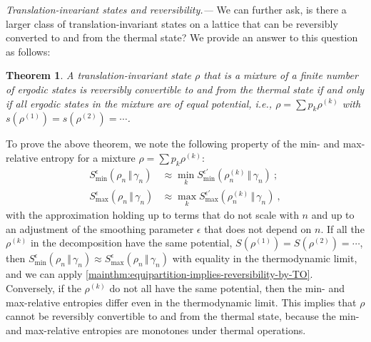 \documentclass[prl,reprint,longbibliography,superscriptaddress]{revtex4-1}
\newcounter{thm}
\newtheorem{maintheorem}[thm]{Theorem}
\renewcommand\paragraph[1]{\par\emph{#1.---}\kern2pt\relax\ignorespaces}
\begin{document}
\paragraph{Translation-invariant states and reversibility}
We can further ask, is there a larger class of translation-invariant states on a
lattice that can be reversibly converted to and from the thermal state?  We
provide an answer to this question as follows:

\begin{maintheorem}
  \label{mainthm:thermo-potential-iff-mix-ergodic-states-eq-potential}
  A translation-invariant state $\rho$ that is a mixture of a finite number of
  ergodic states is reversibly convertible to and from the thermal state if and
  only if all ergodic states in the mixture are of equal potential, i.e.,
  $\rho=\sum p_k \rho^{(k)}$ with $s(\rho^{(1)}) = s(\rho^{(2)}) = \cdots$.
\end{maintheorem}

To prove the above theorem, we note the following property of the min- and
max-relative entropy for a mixture $\rho=\sum p_k \rho^{(k)}$:
\begin{subequations}
  \begin{align}
    {S}_{\mathrm{min}}^{\epsilon}(\rho_n\,\Vert\,\gamma_n)
    &\approx \min_k {S}_{\mathrm{min}}^{\epsilon'}(\rho_n^{(k)}\,\Vert\,\gamma_n)\ ;
    \\
    {S}_{\mathrm{max}}^{\epsilon}(\rho_n\,\Vert\,\gamma_n)
    &\approx \max_k {S}_{\mathrm{max}}^{\epsilon'}(\rho_n^{(k)}\,\Vert\,\gamma_n)\ ,
  \end{align}
\end{subequations}
with the approximation holding up to terms that do not scale with $n$ and up to
an adjustment of the smoothing parameter $\epsilon$ that does not depend on $n$.
If all the $\rho^{(k)}$ in the decomposition have the same potential,
$S(\rho^{(1)}) = S(\rho^{(2)}) = \cdots$, then
${S}_{\mathrm{min}}^{\epsilon}(\rho_n\,\Vert\,\gamma_n) \approx {S}_{\mathrm{max}}^{\epsilon}(\rho_n\,\Vert\,\gamma_n)$
with equality in the thermodynamic limit, and we can apply
\cref{mainthm:equipartition-implies-reversibility-by-TO}.  Conversely, if the
$\rho^{(k)}$ do not all have the same potential, then the min- and max-relative
entropies differ even in the thermodynamic limit.  This implies that $\rho$
cannot be reversibly convertible to and from the thermal state, because the min-
and max-relative entropies are monotones under thermal operations.
\end{document}
